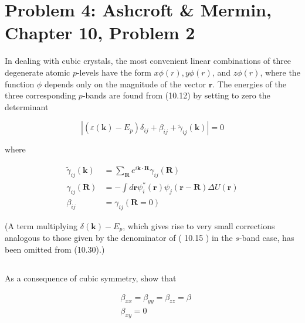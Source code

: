 \documentclass{article}
\begin{document}
\section{Problem 4: Ashcroft \& Mermin, Chapter 10, Problem 2}

In dealing with cubic crystals, the most convenient linear combinations of three degenerate atomic $p$-levels have the form $x \phi(r), y \phi(r)$, and $z \phi(r)$, where the function $\phi$ depends only on the magnitude of the vector $\mathbf{r}$. The energies of the three corresponding $p$-bands are found from (10.12) by setting to zero the determinant


\begin{equation*}
\left|\left(\varepsilon(\mathbf{k})-E_{p}\right) \delta_{i j}+\beta_{i j}+\tilde{\gamma}_{i j}(\mathbf{k})\right|=0 \tag{10.30}
\end{equation*}


where


\begin{align*}
\tilde{\gamma}_{i j}(\mathbf{k}) & =\sum_{\mathbf{R}} e^{i \mathbf{k} \cdot \mathbf{R}} \gamma_{i j}(\mathbf{R}) \\
\gamma_{i j}(\mathbf{R}) & =-\int d \mathbf{r} \psi_{i}^{*}(\mathbf{r}) \psi_{j}(\mathbf{r}-\mathbf{R}) \Delta U(\mathbf{r}) \\
\beta_{i j} & =\gamma_{i j}(\mathbf{R}=0) \tag{10.31}
\end{align*}


(A term multiplying $\delta(\mathbf{k})-E_{p}$, which gives rise to very small corrections analogous to those given by the denominator of ( 10.15 ) in the $s$-band case, has been omitted from (10.30).)\\
\subsection{}
As a consequence of cubic symmetry, show that

\begin{align*}
& \beta_{x x}=\beta_{y y}=\beta_{z z}=\beta \\
& \beta_{x y}=0 \tag{10.32}
\end{align*}
\end{document}
